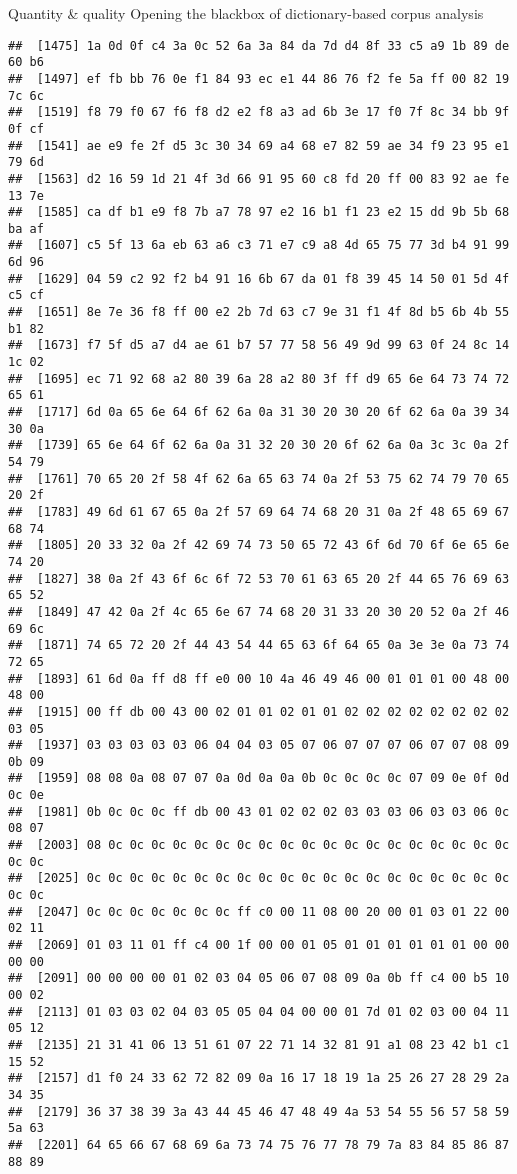 \documentclass[
  ignorenonframetext,
]{beamer}
\begin{document}
\begin{frame}[fragile]{Quantity \& quality \textbar{} Opening the
blackbox of dictionary-based corpus analysis}
\begin{verbatim}
##  [1475] 1a 0d 0f c4 3a 0c 52 6a 3a 84 da 7d d4 8f 33 c5 a9 1b 89 de 60 b6
##  [1497] ef fb bb 76 0e f1 84 93 ec e1 44 86 76 f2 fe 5a ff 00 82 19 7c 6c
##  [1519] f8 79 f0 67 f6 f8 d2 e2 f8 a3 ad 6b 3e 17 f0 7f 8c 34 bb 9f 0f cf
##  [1541] ae e9 fe 2f d5 3c 30 34 69 a4 68 e7 82 59 ae 34 f9 23 95 e1 79 6d
##  [1563] d2 16 59 1d 21 4f 3d 66 91 95 60 c8 fd 20 ff 00 83 92 ae fe 13 7e
##  [1585] ca df b1 e9 f8 7b a7 78 97 e2 16 b1 f1 23 e2 15 dd 9b 5b 68 ba af
##  [1607] c5 5f 13 6a eb 63 a6 c3 71 e7 c9 a8 4d 65 75 77 3d b4 91 99 6d 96
##  [1629] 04 59 c2 92 f2 b4 91 16 6b 67 da 01 f8 39 45 14 50 01 5d 4f c5 cf
##  [1651] 8e 7e 36 f8 ff 00 e2 2b 7d 63 c7 9e 31 f1 4f 8d b5 6b 4b 55 b1 82
##  [1673] f7 5f d5 a7 d4 ae 61 b7 57 77 58 56 49 9d 99 63 0f 24 8c 14 1c 02
##  [1695] ec 71 92 68 a2 80 39 6a 28 a2 80 3f ff d9 65 6e 64 73 74 72 65 61
##  [1717] 6d 0a 65 6e 64 6f 62 6a 0a 31 30 20 30 20 6f 62 6a 0a 39 34 30 0a
##  [1739] 65 6e 64 6f 62 6a 0a 31 32 20 30 20 6f 62 6a 0a 3c 3c 0a 2f 54 79
##  [1761] 70 65 20 2f 58 4f 62 6a 65 63 74 0a 2f 53 75 62 74 79 70 65 20 2f
##  [1783] 49 6d 61 67 65 0a 2f 57 69 64 74 68 20 31 0a 2f 48 65 69 67 68 74
##  [1805] 20 33 32 0a 2f 42 69 74 73 50 65 72 43 6f 6d 70 6f 6e 65 6e 74 20
##  [1827] 38 0a 2f 43 6f 6c 6f 72 53 70 61 63 65 20 2f 44 65 76 69 63 65 52
##  [1849] 47 42 0a 2f 4c 65 6e 67 74 68 20 31 33 20 30 20 52 0a 2f 46 69 6c
##  [1871] 74 65 72 20 2f 44 43 54 44 65 63 6f 64 65 0a 3e 3e 0a 73 74 72 65
##  [1893] 61 6d 0a ff d8 ff e0 00 10 4a 46 49 46 00 01 01 01 00 48 00 48 00
##  [1915] 00 ff db 00 43 00 02 01 01 02 01 01 02 02 02 02 02 02 02 02 03 05
##  [1937] 03 03 03 03 03 06 04 04 03 05 07 06 07 07 07 06 07 07 08 09 0b 09
##  [1959] 08 08 0a 08 07 07 0a 0d 0a 0a 0b 0c 0c 0c 0c 07 09 0e 0f 0d 0c 0e
##  [1981] 0b 0c 0c 0c ff db 00 43 01 02 02 02 03 03 03 06 03 03 06 0c 08 07
##  [2003] 08 0c 0c 0c 0c 0c 0c 0c 0c 0c 0c 0c 0c 0c 0c 0c 0c 0c 0c 0c 0c 0c
##  [2025] 0c 0c 0c 0c 0c 0c 0c 0c 0c 0c 0c 0c 0c 0c 0c 0c 0c 0c 0c 0c 0c 0c
##  [2047] 0c 0c 0c 0c 0c 0c 0c ff c0 00 11 08 00 20 00 01 03 01 22 00 02 11
##  [2069] 01 03 11 01 ff c4 00 1f 00 00 01 05 01 01 01 01 01 01 00 00 00 00
##  [2091] 00 00 00 00 01 02 03 04 05 06 07 08 09 0a 0b ff c4 00 b5 10 00 02
##  [2113] 01 03 03 02 04 03 05 05 04 04 00 00 01 7d 01 02 03 00 04 11 05 12
##  [2135] 21 31 41 06 13 51 61 07 22 71 14 32 81 91 a1 08 23 42 b1 c1 15 52
##  [2157] d1 f0 24 33 62 72 82 09 0a 16 17 18 19 1a 25 26 27 28 29 2a 34 35
##  [2179] 36 37 38 39 3a 43 44 45 46 47 48 49 4a 53 54 55 56 57 58 59 5a 63
##  [2201] 64 65 66 67 68 69 6a 73 74 75 76 77 78 79 7a 83 84 85 86 87 88 89

\end{verbatim}
\end{frame}
\end{document}
